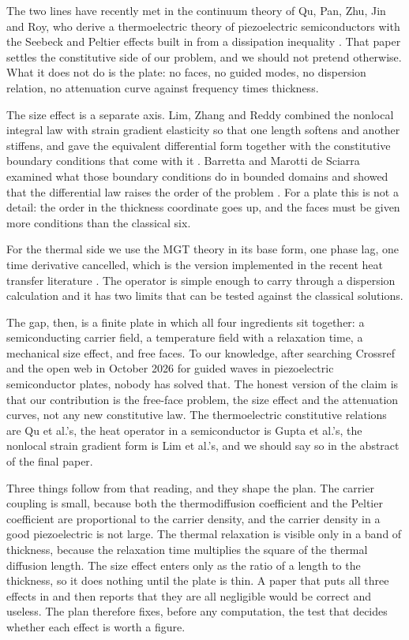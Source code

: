 \documentclass[11pt]{article}
\begin{document}
The two lines have recently met in the continuum theory of Qu, Pan, Zhu, Jin and Roy, who derive a
thermoelectric theory of piezoelectric semiconductors with the Seebeck and Peltier effects built in from a
dissipation inequality \cite{Qu2023}. That paper settles the constitutive side of our problem, and we
should not pretend otherwise. What it does not do is the plate: no faces, no guided modes, no dispersion
relation, no attenuation curve against frequency times thickness.

The size effect is a separate axis. Lim, Zhang and Reddy combined the nonlocal integral law with strain
gradient elasticity so that one length softens and another stiffens, and gave the equivalent differential
form together with the constitutive boundary conditions that come with it \cite{Lim2015}. Barretta and
Marotti de Sciarra examined what those boundary conditions do in bounded domains and showed that the
differential law raises the order of the problem \cite{Barretta2018}. For a plate this is not a detail:
the order in the thickness coordinate goes up, and the faces must be given more conditions than the
classical six.

For the thermal side we use the MGT theory in its base form, one phase lag, one time
derivative cancelled, which is the version implemented in the recent heat transfer literature
\cite{Gupta2025}. The operator is simple enough to carry through a dispersion calculation and it has two
limits that can be tested against the classical solutions.

The gap, then, is a finite plate in which all four ingredients sit together: a semiconducting carrier
field, a temperature field with a relaxation time, a mechanical size effect, and free faces. To our
knowledge, after searching Crossref and the open web in October 2026 for guided waves in piezoelectric
semiconductor plates, nobody has solved that. The honest version of the claim is that our contribution is
the free-face problem, the size effect and the attenuation curves, not any new constitutive law. The
thermoelectric constitutive relations are Qu et al.'s, the heat operator in a semiconductor is Gupta et
al.'s, the nonlocal strain gradient form is Lim et al.'s, and we should say so in the abstract of the final
paper.

Three things follow from that reading, and they shape the plan. The carrier coupling is small, because
both the thermodiffusion coefficient and the Peltier coefficient are proportional to the carrier density,
and the carrier density in a good piezoelectric is not large. The thermal relaxation is visible only in a
band of thickness, because the relaxation time multiplies the square of the thermal diffusion length. The
size effect enters only as the ratio of a length to the thickness, so it does nothing until the plate is
thin. A paper that puts all three effects in and then reports that they are all negligible would be
correct and useless. The plan therefore fixes, before any computation, the test that decides whether each
effect is worth a figure.
\end{document}
